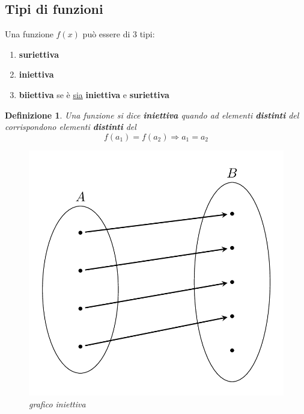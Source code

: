 \documentclass[12pt, a4paper]{article}
\theoremstyle{break}
\newtheorem{defn}{Definizione}
\theoremstyle{lemma}
\theoremstyle{lemma}
\theoremstyle{lemma}
\begin{document}
\subsection{Tipi di funzioni}

Una funzione $f(x)$ può essere di 3 tipi:
\begin{enumerate}
    \item \textbf{suriettiva}
    \item \textbf{iniettiva}
    \item \textbf{biiettiva} se è \underline{sia} \textbf{iniettiva} e  \textbf{suriettiva}
    \end{enumerate}

    \begin{defn} Una funzione si dice \textbf{iniettiva} quando ad elementi \textbf{distinti} del  corrispondono elementi \textbf{distinti} del 
\begin{equation}
  f(a_1) = f(a_2) \Rightarrow a_1 = a_2
\end{equation}

\begin{figure}[ht]
	\center
	\includegraphics[scale=0.135]{iniettiva}
	\caption{grafico iniettiva}
	\label{fig:grafico_iniettiva}
\end{figure}
\end{defn}
\noindent
\end{document}
